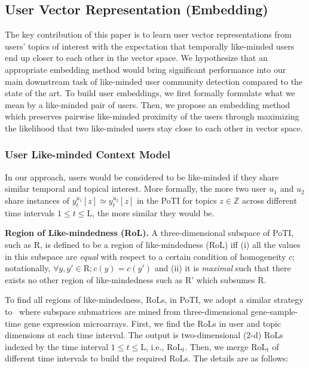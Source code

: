 \documentclass[sigconf]{acmart}
\begin{document}
\subsection{User Vector Representation (Embedding)}
The key contribution of this paper is to learn user vector representations from users' topics of interest with the expectation that temporally like-minded users end up closer to each other in the vector space. We hypothesize that an appropriate embedding method would bring significant performance into our main downstream task of like-minded user community detection compared to the state of the art. To build user embeddings, we first formally formulate what we mean by a like-minded pair of users. Then, we propose an embedding method which preserves pairwise like-minded proximity of the users through maximizing the likelihood that two like-minded users stay close to each other in vector space.

\subsubsection{User Like-minded Context Model}
In our approach, users would be considered to be like-minded if they share similar temporal and topical interest. More formally, the more two user $u_1$ and $u_2$ share instances of $y^{u_1}_t[z]\simeq{y^{u_2}_t[z]}$ in the PoTI for topics $z\in\mathbb{Z}$ across different time intervals $1\leq{t}\leq\text{L}$, the more similar they would be. 

\begin{definition}
  \textbf{Region of Like-mindedness (RoL).} A three-dimensional subspace of PoTI, such as $\text{R}$, is defined to be a region of like-mindedness (RoL) iff (i) all the values in this subspace are \textit{equal} with respect to a certain condition of homogeneity $c$; notationally, $\forall{y,y'}\in\text{R};c(y)=c(y')$ and (ii) it is \textit{maximal} such that there exists no other region of like-mindedness such as $\text{R'}$ which subsumes $\text{R}$.
\end{definition}

To find all regions of like-mindedness, RoLs, in PoTI, we adopt a similar strategy to~\cite{DBLP:conf/sigmod/ZhaoZ05} where subspace submatrices are mined from three-dimensional gene-sample-time gene expression microarrays. First, we find the RoLs in user and topic dimensions at each time interval. The output is two-dimensional (2-d) RoLs indexed by the time interval $1\leq{t}\leq\text{L}$, i.e., $\text{RoL}_t$. Then, we merge $\text{RoL}_t$ of different time intervals to build the required RoLs. The details are as follows:
\end{document}
